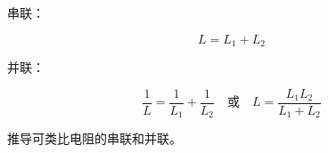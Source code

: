 
\begin{issues}
\issueDraft
\end{issues}


串联：

\begin{equation}
L = L_1 + L_2
\end{equation}

并联：

\begin{equation}
\frac{1}{L} = \frac{1}{L_1} + \frac{1}{L_2}
\quad \text{或} \quad
L = \frac{L_1L_2}{L_1 + L_2}
\end{equation}

推导可类比电阻的串联和并联。
